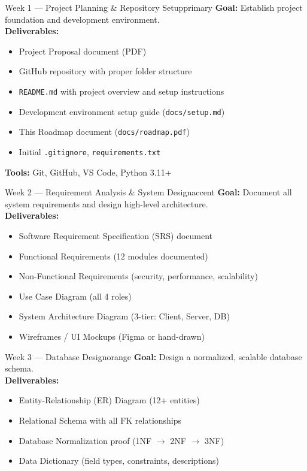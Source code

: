 \documentclass[12pt,a4paper]{article}
\begin{document}
\begin{weekbox}{Week 1 --- Project Planning \& Repository Setup}{primary}
\textbf{Goal:} Establish project foundation and development environment.\\[6pt]
\textbf{Deliverables:}
\begin{itemize}[leftmargin=*, itemsep=2pt]
  \item Project Proposal document (PDF)
  \item GitHub repository with proper folder structure
  \item \texttt{README.md} with project overview and setup instructions
  \item Development environment setup guide (\texttt{docs/setup.md})
  \item This Roadmap document (\texttt{docs/roadmap.pdf})
  \item Initial \texttt{.gitignore}, \texttt{requirements.txt}
\end{itemize}
\textbf{Tools:} Git, GitHub, VS Code, Python 3.11+
\end{weekbox}

\vspace{8pt}

\begin{weekbox}{Week 2 --- Requirement Analysis \& System Design}{accent}
\textbf{Goal:} Document all system requirements and design high-level architecture.\\[6pt]
\textbf{Deliverables:}
\begin{itemize}[leftmargin=*, itemsep=2pt]
  \item Software Requirement Specification (SRS) document
  \item Functional Requirements (12 modules documented)
  \item Non-Functional Requirements (security, performance, scalability)
  \item Use Case Diagram (all 4 roles)
  \item System Architecture Diagram (3-tier: Client, Server, DB)
  \item Wireframes / UI Mockups (Figma or hand-drawn)
\end{itemize}
\end{weekbox}

\vspace{8pt}

\begin{weekbox}{Week 3 --- Database Design}{orange}
\textbf{Goal:} Design a normalized, scalable database schema.\\[6pt]
\textbf{Deliverables:}
\begin{itemize}[leftmargin=*, itemsep=2pt]
  \item Entity-Relationship (ER) Diagram (12+ entities)
  \item Relational Schema with all FK relationships
  \item Database Normalization proof (1NF $\rightarrow$ 2NF $\rightarrow$ 3NF)
  \item Data Dictionary (field types, constraints, descriptions)
\end{itemize}
\end{weekbox}
\end{document}
